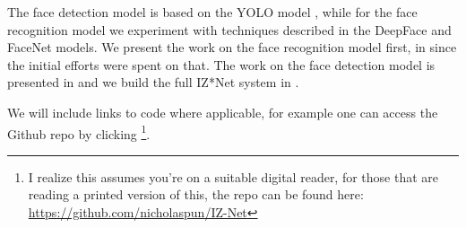 
The face detection model is based on the YOLO model \cite{YOLO, YOLOv2, YOLOv3}, while for the face recognition model we experiment with techniques described in the DeepFace \cite{deepface} and FaceNet \cite{facenet} models.
We present the work on the face recognition model first, in  since the initial efforts were spent on that.
The work on the face detection model is presented in  and we build the full IZ*Net system in .

We will include links to code where applicable, for example one can access the Github repo by clicking \href{https://github.com/nicholaspun/IZ-Net}{}\footnote{I realize this assumes you're on a suitable digital reader, for those that are reading a printed version of this, the repo can be found here: \url{https://github.com/nicholaspun/IZ-Net}}.